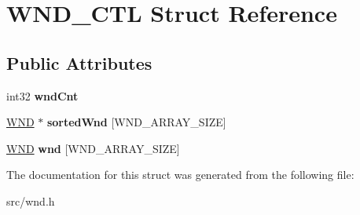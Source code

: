 \hypertarget{struct_w_n_d___c_t_l}{}\section{W\+N\+D\+\_\+\+C\+T\+L Struct Reference}
\label{struct_w_n_d___c_t_l}
\subsection*{Public Attributes}
\begin{DoxyCompactItemize}
\item 
\hypertarget{struct_w_n_d___c_t_l_a1861983eac2a1458114c7b45b53d9cf9}{}int32 {\bfseries wnd\+Cnt}\label{struct_w_n_d___c_t_l_a1861983eac2a1458114c7b45b53d9cf9}

\item 
\hypertarget{struct_w_n_d___c_t_l_ac4ea65dc4577ab1366244d6790e486c3}{}\hyperlink{struct_w_n_d}{W\+N\+D} $\ast$ {\bfseries sorted\+Wnd} \mbox{[}W\+N\+D\+\_\+\+A\+R\+R\+A\+Y\+\_\+\+S\+I\+Z\+E\mbox{]}\label{struct_w_n_d___c_t_l_ac4ea65dc4577ab1366244d6790e486c3}

\item 
\hypertarget{struct_w_n_d___c_t_l_a91354c31978cb5edac1fc3e6695220d9}{}\hyperlink{struct_w_n_d}{W\+N\+D} {\bfseries wnd} \mbox{[}W\+N\+D\+\_\+\+A\+R\+R\+A\+Y\+\_\+\+S\+I\+Z\+E\mbox{]}\label{struct_w_n_d___c_t_l_a91354c31978cb5edac1fc3e6695220d9}

\end{DoxyCompactItemize}


The documentation for this struct was generated from the following file\+:\begin{DoxyCompactItemize}
\item 
src/wnd.\+h\end{DoxyCompactItemize}
